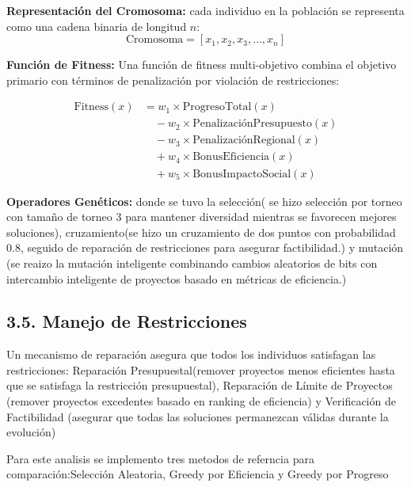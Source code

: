 \documentclass[12pt,a4paper]{article}
\begin{document}
\textbf{Representación del Cromosoma:}
cada individuo en la población se representa como una cadena binaria de longitud $n$:
\begin{equation}
\text{Cromosoma} = [x_1, x_2, x_3, \ldots, x_n]
\end{equation}

\textbf{Función de Fitness:}
Una función de fitness multi-objetivo combina el objetivo primario con términos de penalización por violación de restricciones:

\begin{align}
\text{Fitness}(x) &= w_1 \times \text{ProgresoTotal}(x) \nonumber \\
&\quad - w_2 \times \text{PenalizaciónPresupuesto}(x) \nonumber \\
&\quad - w_3 \times \text{PenalizaciónRegional}(x) \nonumber \\
&\quad + w_4 \times \text{BonusEficiencia}(x) \nonumber \\
&\quad + w_5 \times \text{BonusImpactoSocial}(x)
\end{align}

\textbf{Operadores Genéticos:} donde se tuvo la selección( se hizo selección por torneo con tamaño de torneo 3 para mantener diversidad mientras se favorecen mejores soluciones), cruzamiento(se hizo un cruzamiento de dos puntos con probabilidad 0.8, seguido de reparación de restricciones para asegurar factibilidad.) y mutación (se reaizo la mutación inteligente combinando cambios aleatorios de bits con intercambio inteligente de proyectos basado en métricas de eficiencia.)

\subsection*{3.5. Manejo de Restricciones}

Un mecanismo de reparación asegura que todos los individuos satisfagan las restricciones: Reparación Presupuestal(remover proyectos menos eficientes hasta que se satisfaga la restricción presupuestal), Reparación de Límite de Proyectos (remover proyectos excedentes basado en ranking de eficiencia) y Verificación de Factibilidad (asegurar que todas las soluciones permanezcan válidas durante la evolución)

\vspace{0.5cm}

Para este analisis se implemento tres metodos de referncia para comparación:Selección Aleatoria, Greedy por Eficiencia y Greedy por Progreso 
\end{document}
